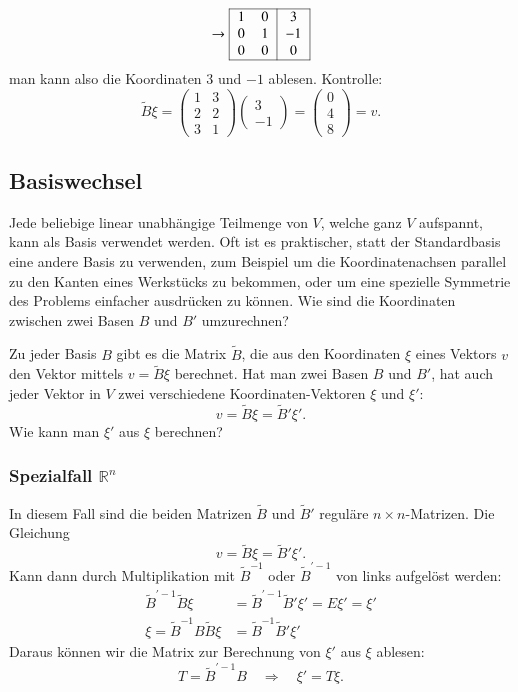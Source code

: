 \begin{beispiel}
\[\rightarrow
\begin{tabular}{|>{$}c<{$}>{$}c<{$}|>{$}c<{$}|}
\hline
1&0&3\\
0&1&-1\\
0&0&0\\
\hline
\end{tabular}
\]
man kann also die Koordinaten $3$ und $-1$ ablesen.
Kontrolle:
\[
\tilde B\xi
=
\begin{pmatrix}
1&3\\
2&2\\
3&1\end{pmatrix}
\begin{pmatrix}3\\-1\end{pmatrix}
=\begin{pmatrix}
0\\4\\8
\end{pmatrix}
=v.
\]
\end{beispiel}

\subsection{Basiswechsel}
Jede beliebige linear unabhängige Teilmenge von $V$, welche ganz $V$
aufspannt, kann als Basis verwendet werden.
Oft ist es praktischer,
statt der Standardbasis eine andere Basis zu verwenden, zum Beispiel
um die Koordinatenachsen parallel zu den Kanten eines Werkstücks zu
bekommen, oder um eine spezielle Symmetrie des Problems einfacher
ausdrücken zu können.
Wie sind die Koordinaten zwischen zwei Basen $B$ und $B'$ umzurechnen?

Zu jeder Basis $B$ gibt es die Matrix $\tilde B$, die aus den
Koordinaten $\xi$ eines Vektors $v$ den Vektor mittels $v=\tilde B\xi$
berechnet.
Hat man zwei Basen $B$ und $B'$, hat auch jeder Vektor
in $V$ zwei verschiedene Koordinaten-Vektoren $\xi$ und $\xi'$:
\[
v=\tilde B\xi =\tilde B'\xi'.
\]
Wie kann man $\xi'$ aus $\xi$ berechnen?

\subsubsection{Spezialfall $\mathbb R^n$}
In diesem Fall sind die beiden Matrizen $\tilde B$ und $\tilde B'$
reguläre $n\times n$-Matrizen.
Die Gleichung
\[
v=\tilde B\xi =\tilde B'\xi'.
\]
Kann dann durch Multiplikation mit $\tilde B^{-1}$ oder $\tilde B^{\prime-1}$
von links aufgelöst werden:
\begin{align*}
\tilde B^{\prime-1}\tilde B\xi&= \tilde B^{\prime -1}\tilde B'\xi'=E\xi'=\xi'\\
\xi=\tilde B^{-1}B\tilde B\xi&=\tilde B^{-1}\tilde B'\xi'
\end{align*}
Daraus können wir die Matrix zur Berechnung von $\xi'$ aus $\xi$
ablesen: 
\[
T=\tilde B^{\prime-1}B \quad\Rightarrow\quad
\xi'=T\xi.
\]

